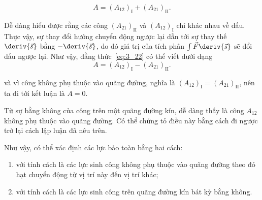 \begin{equation}\label{eq:3_22}
A = (A_{12})_{\text{I}} + (A_{21})_{\text{II}}.
\end{equation}

\noindent
Dễ dàng hiểu được rằng các công $(A_{21})_{\text{II}}$ và $(A_{12})_{\text{I}}$ chỉ khác nhau về dấu. Thực vậy, sự thay đổi hướng chuyển động ngược lại dẫn tới sự thay thế $\deriv{\vec{s}}$ bằng $-\deriv{\vec{s}}$, do đó giá trị của tích phân $\int\vec{F}\deriv{\vec{s}}$ sẽ đổi dấu ngược lại. Như vậy, đằng thức~\eqref{eq:3_22} có thể viết dưới dạng
\begin{equation*}
A = (A_{12})_{\text{I}} - (A_{21})_{\text{II}}.
\end{equation*}

\noindent
và vì công không phụ thuộc vào quãng đường, nghĩa là $(A_{12})_{\text{I}}=(A_{21})_{\text{II}}$, nên ta đi tới kết luận là $A=0$.

Từ sự bằng không của công trên một quãng đường kín, dễ dàng thấy là công $A_{12}$ không phụ thuộc vào quãng đường. Có thể chứng tỏ điều này bằng cách đi ngược trở lại cách lập luận đã nêu trên. 

Như vậy, có thể xác định các lực bảo toàn bằng hai cách: 
\begin{enumerate}[(1)]
    \item với tính cách là các lực sinh công không phụ thuộc vào quãng đường theo đó hạt chuyển động từ vị trí này đến vị trí khác;
    \item với tính cách là các lực sinh công trên quãng đường kín bát kỳ bằng không.
\end{enumerate}

